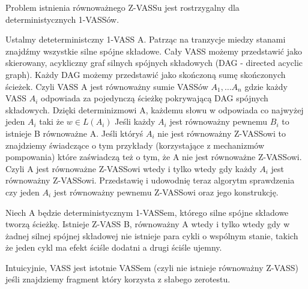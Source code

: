     \begin{lemma}
        \label{1-dim-det-vass}
        Problem istnienia równoważnego Z-VASSu jest rostrzygalny dla deterministycznych 1-VASSów.
    \end{lemma}
    Ustalmy deteterministczny 1-VASS A.
    Patrząc na tranzycje miedzy stanami znajdźmy wszystkie silne spójne składowe.
    Cały VASS możemy przedstawić jako skierowany, acykliczny graf silnych spójnych składowych (DAG - directed acyclic graph).
    Każdy DAG możemy przedstawić jako skończoną sumę skończonych ścieżek.
    Czyli VASS A jest równoważny sumie VASSów $A_1, \dots A_n$ gdzie każdy VASS $A_i$ odpowiada za pojedynczą ścieżkę pokrywającą DAG spójnych składowych.
    Dzięki determinizmowi A, każdemu słowu w odpowiada co najwyżej jeden $A_i$ taki że $w \in L(A_i)$
    Jeśli każdy $A_i$ jest równoważny pewnemu $B_i$ to istnieje B równoważne A.
    Jeśli któryś $A_i$ nie jest równoważny Z-VASSowi to znajdziemy świadczące o tym przykłady (korzystające z mechanizmów pompowania) które
    zaświadczą też o tym, że A nie jest równoważne Z-VASSowi.
    Czyli A jest równoważne Z-VASSowi wtedy i tylko wtedy gdy każdy $A_i$ jest równoważny Z-VASSowi.
    Przedstawię i udowodnię teraz algorytm sprawdzenia czy jeden $A_i$ jest równoważny pewnemu Z-VASSowi oraz jego konstrukcję.
    \begin{theorem}
        Niech A będzie deterministycznym 1-VASSem, którego silne spójne składowe tworzą ścieżkę.
        Istnieje Z-VASS B, równoważny A wtedy i tylko wtedy gdy w żadnej silnej spójnej składowej nie istnieje para cykli o wspólnym stanie,
        takich że jeden cykl ma efekt ściśle dodatni a drugi ściśle ujemny.
    \end{theorem}
    Intuicyjnie, VASS jest istotnie VASSem (czyli nie istnieje równoważny Z-VASS) jeśli znajdziemy fragment który korzysta z słabego zerotestu.
